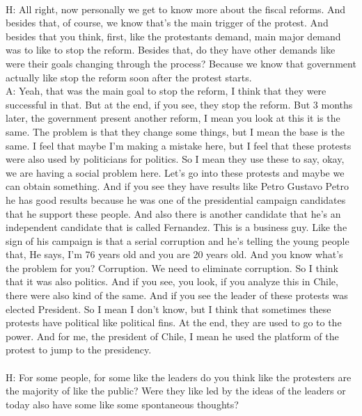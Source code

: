 \documentclass{phyasgn}\usepackage{nag}
\begin{document}
\\
H: All right, now personally we get to know more about the fiscal reforms. And besides that, of course, we know that's the main trigger of the protest. And besides that you think, first, like the protestants demand, main major demand was to like to stop the reform. Besides that, do they have other demands like were their goals changing through the process? Because we know that government actually like stop the reform soon after the protest starts.\\
A: Yeah, that was the main goal to stop the reform, I think that they were successful in that. But at the end, if you see, they stop the reform. But 3 months later, the government present another reform, I mean you look at this it is the same. The problem is that they change some things, but I mean the base is the same. I feel that maybe I'm making a mistake here, but I feel that these protests were also used by politicians for politics. So I mean they use these to say, okay, we are having a social problem here. Let's go into these protests and maybe we can obtain something. And if you see they have results like Petro Gustavo Petro he has good results because he was one of the presidential campaign candidates that he support these people. And also there is another candidate that he's an independent candidate that is called Fernandez. This is a business guy. Like the sign of his campaign is that a serial corruption and he's telling the young people that, He says, I'm 76 years old and you are 20 years old. And you know what's the problem for you? Corruption. We need to eliminate corruption. So I think that it was also politics. And if you see, you look, if you analyze this in Chile, there were also kind of the same. And if you see the leader of these protests was elected President.  So I mean I don't know, but I think that sometimes these protests have political like political fins. At the end, they are used to go to the power. And for me, the president of Chile, I mean he used the platform of the protest to jump to the presidency. \\
\\
H: For some people, for some like the leaders do you think like the protesters are the majority of like the public? Were they like led by the ideas of the leaders or today also have some like some spontaneous thoughts? \\
\end{document}

